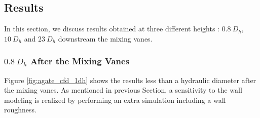 \subsection{Results}

In this section, we discuss results obtained at three different heights : $0.8\ D_{h}$, $10\ D_{h}$ and $23\ D_{h}$ downstream the mixing vanes.


\subsubsection{$0.8\ D_{h}$ After the Mixing Vanes}

Figure \ref{fig:agate_cfd_1dh} shows the results less than a hydraulic diameter after the mixing vanes. As mentioned in previous Section, a sensitivity to the wall modeling is realized by performing an extra simulation including a wall roughness.


